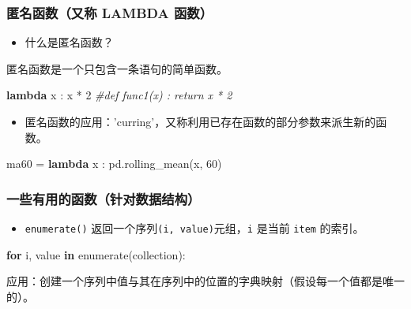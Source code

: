 \documentclass[]{article}
\newenvironment{Shaded}{}{}
\newcommand{\KeywordTok}[1]{\textcolor[rgb]{0.00,0.44,0.13}{\textbf{#1}}}
\newcommand{\DecValTok}[1]{\textcolor[rgb]{0.25,0.63,0.44}{#1}}
\newcommand{\CommentTok}[1]{\textcolor[rgb]{0.38,0.63,0.69}{\textit{#1}}}
\newcommand{\ControlFlowTok}[1]{\textcolor[rgb]{0.00,0.44,0.13}{\textbf{#1}}}
\newcommand{\OperatorTok}[1]{\textcolor[rgb]{0.40,0.40,0.40}{#1}}
\newcommand{\BuiltInTok}[1]{#1}
\newcommand{\NormalTok}[1]{#1}
\begin{document}
\subsubsection{匿名函数（又称 LAMBDA 函数）}\label{header-n254}

\begin{itemize}
\item
  什么是匿名函数？
\end{itemize}

匿名函数是一个只包含一条语句的简单函数。

\begin{Shaded}
\begin{Highlighting}[]
\KeywordTok{lambda}\NormalTok{ x : x }\OperatorTok{*} \DecValTok{2}
\CommentTok{#def func1(x) : return x * 2}
\end{Highlighting}
\end{Shaded}

\begin{itemize}
\item
  匿名函数的应用：'curring'，又称利用已存在函数的部分参数来派生新的函数。
\end{itemize}

\begin{Shaded}
\begin{Highlighting}[]
\NormalTok{ma60 }\OperatorTok{=} \KeywordTok{lambda}\NormalTok{ x : pd.rolling_mean(x, }\DecValTok{60}\NormalTok{)}
\end{Highlighting}
\end{Shaded}

\subsubsection{一些有用的函数（针对数据结构）}\label{header-n267}

\begin{itemize}
\item
  \texttt{enumerate()} 返回一个序列\texttt{(i,\ value)}元组，\texttt{i}
  是当前 \texttt{item} 的索引。
\end{itemize}

\begin{Shaded}
\begin{Highlighting}[]
\ControlFlowTok{for}\NormalTok{ i, value }\KeywordTok{in} \BuiltInTok{enumerate}\NormalTok{(collection):}
\end{Highlighting}
\end{Shaded}

应用：创建一个序列中值与其在序列中的位置的字典映射（假设每一个值都是唯一的）。
\end{document}
